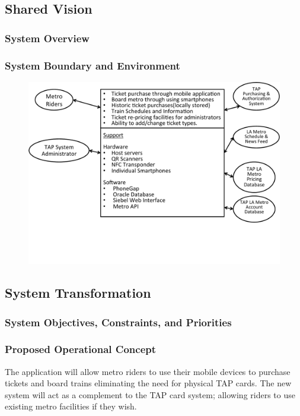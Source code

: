 

\subsection{Shared Vision}

	\subsubsection{System Overview}\begin{multicols}{2}
		
	\end{multicols}
 	\newpage

 	\subsubsection{System Boundary and Environment}
 	\begin{figure}[h]
 		\centering
 		\includegraphics[width=\textwidth]{OCD/boundary.pdf}
 	\end{figure}
 	\newpage
 		
\subsection{System Transformation}
	\subsubsection{System Objectives, Constraints, and Priorities}
		
	
	
	\subsubsection{Proposed Operational Concept}
		The application will allow metro riders to use their mobile devices to purchase tickets and board trains eliminating the need for physical TAP cards. The new system will act as a complement to the TAP card system; allowing riders to use existing metro facilities if they wish.
		
